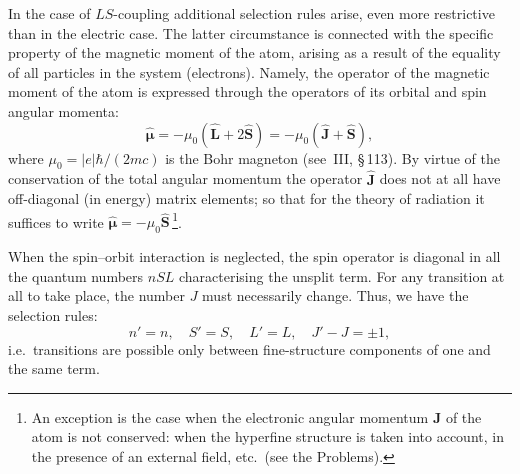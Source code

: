 In the case of $LS$-coupling additional selection rules arise, even more restrictive than in the electric case. The latter circumstance is connected with the specific property of the magnetic moment of the atom, arising as a result of the equality of all particles in the system (electrons). Namely, the operator of the magnetic moment of the atom is expressed through the operators of its orbital and spin angular momenta:
\begin{equation}
\widehat{\boldsymbol{\mu}} = -\mu_0(\widehat{\mathbf{L}} + 2\widehat{\mathbf{S}}) = -\mu_0(\widehat{\mathbf{J}} + \widehat{\mathbf{S}}),
\tag{50.4}
\end{equation}
where $\mu_0 = |e|\hbar/(2mc)$ is the Bohr magneton (see~III, \S\,113). By virtue of the conservation of the total angular momentum the operator $\widehat{\mathbf{J}}$ does not at all have off-diagonal (in energy) matrix elements; so that for the theory of radiation it suffices to write $\widehat{\boldsymbol{\mu}} = -\mu_0\widehat{\mathbf{S}}$\,\footnote{An exception is the case when the electronic angular momentum $\mathbf{J}$ of the atom is not conserved: when the hyperfine structure is taken into account, in the presence of an external field, etc.\ (see the Problems).}.

When the spin--orbit interaction is neglected, the spin operator is diagonal in all the quantum numbers $nSL$ characterising the unsplit term. For any transition at all to take place, the number $J$ must necessarily change. Thus, we have the selection rules:
\begin{equation}
n' = n,\quad S' = S,\quad L' = L,\quad J' - J = \pm 1,
\tag{50.5}
\end{equation}
i.e.\ transitions are possible only between fine-structure components of one and the same term.

